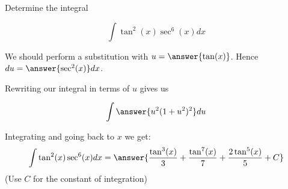 \documentclass{ximera}
\author{Jason Miller}
\begin{document}
\begin{exercise}
Determine the integral

\[
\int \tan^{2}(x) \sec^{6}(x) dx
\]

We should perform a substitution with $u=\answer{ \tan(x)}$. Hence $du= \answer{ \sec^{2}(x)} dx$. 

\begin{exercise}
Rewriting our integral in terms of $u$ gives us 

\[
\int \answer{u^{2} (1+ u^{2})^{2} } du
\]
\begin{exercise}
Integrating and going back to $x$ we get:
\[
\int \tan^{2}(x) \sec^{6}(x) dx= \answer{  \frac{\tan^{3}(x)}{3} +\frac{ \tan^{7}(x)}{7} + \frac{ 2 \tan^{5}(x)}{5} +C    }
\]
(Use $C$ for the constant of integration)
\end{exercise}
\end{exercise}
\end{exercise}
\end{document}
